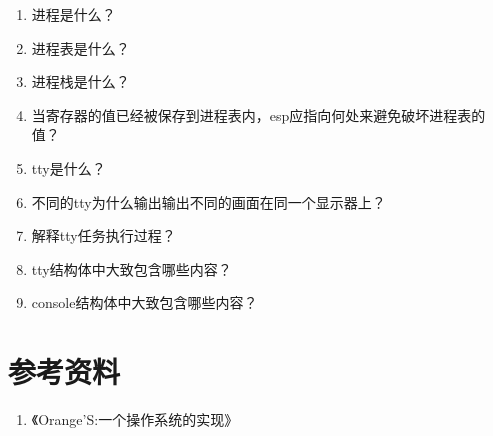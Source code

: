 \documentclass[a4paper]{article}
\begin{document}
\begin{enumerate}
	\item 进程是什么？
	\item 进程表是什么？
	\item 进程栈是什么？
	\item 当寄存器的值已经被保存到进程表内，esp应指向何处来避免破坏进程表的值？
	\item tty是什么？
	\item 不同的tty为什么输出输出不同的画面在同一个显示器上？
	\item 解释tty任务执行过程？
	\item tty结构体中大致包含哪些内容？
	\item console结构体中大致包含哪些内容？
\end{enumerate}

\section{参考资料}
	\begin{enumerate}
		\item 《Orange'S:一个操作系统的实现》
	\end{enumerate}
\end{document}
